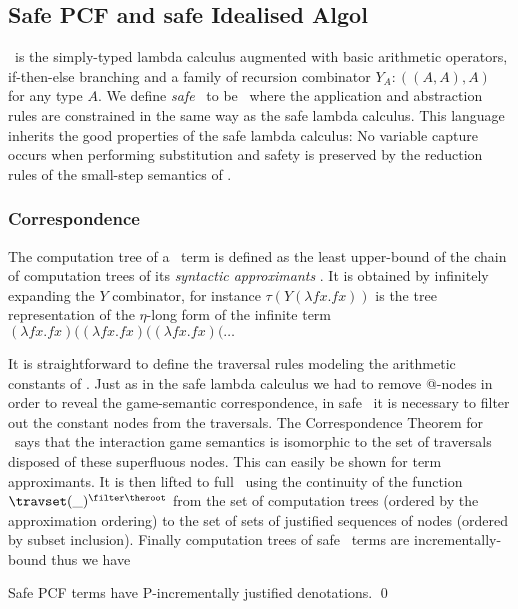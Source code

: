 \subsection*{Safe PCF and safe Idealised Algol}

\pcf\ is the simply-typed lambda calculus augmented with basic
arithmetic operators, if-then-else branching and a family of
recursion combinator $Y_A : ((A,A),A)$ for any type $A$.  We define
\emph{safe} \pcf\ to be \pcf\ where the application and abstraction
rules are constrained in the same way as the safe lambda calculus.
This language inherits the good properties of the safe lambda
calculus: No variable capture occurs when performing substitution
and safety is preserved by the reduction rules of the small-step
semantics of \pcf.

\subsubsection{Correspondence}

The computation tree of a \pcf\ term is defined as the least
upper-bound of the chain of computation trees of its \emph{syntactic
approximants} \cite{abramsky:game-semantics-tutorial}.  It is
obtained by infinitely expanding the $Y$ combinator, for instance
$\tau(Y (\lambda f x. f x))$ is the tree representation of the
$\eta$-long form of the infinite term $(\lambda f x. f x)
 ((\lambda f x. f x) ((\lambda f x. f x) ( \ldots$

It is straightforward to define the traversal rules modeling the
arithmetic constants of \pcf. Just as in the safe lambda calculus we
had to remove @-nodes in order to reveal the game-semantic
correspondence, in safe \pcf\ it is necessary to filter out the
constant nodes from the traversals. The Correspondence Theorem for
\pcf\ says that the interaction game semantics is isomorphic to the
set of traversals disposed of these superfluous nodes. This can
easily be shown for term approximants. It is then lifted to full
\pcf\ using the continuity of the function $\travset(\_)^{\filter
\theroot}$ from the set of computation trees (ordered by the
approximation ordering) to the set of sets of justified sequences of
nodes (ordered by subset inclusion). Finally computation trees of
safe \pcf\ terms are incrementally-bound thus we have
\begin{theorem}
\label{thm:safepcfpincr} Safe PCF terms have P-incrementally
justified denotations. \qed
\end{theorem}


